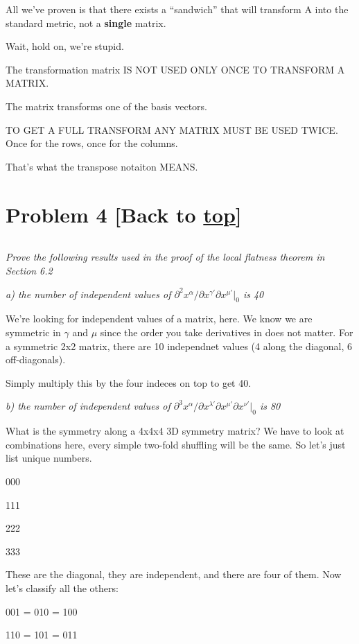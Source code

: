 \documentclass[landscape,letterpaper,10pt,english]{article}
\begin{document}
All we've proven is that there exists a ``sandwich'' that will transform
A into the standard metric, not a \textbf{single} matrix.

    Wait, hold on, we're stupid.

The transformation matrix IS NOT USED ONLY ONCE TO TRANSFORM A MATRIX.

The matrix transforms one of the basis vectors.

TO GET A FULL TRANSFORM ANY MATRIX MUST BE USED TWICE. Once for the
rows, once for the columns.

That's what the transpose notaiton MEANS.

    \hypertarget{problem-4-back-to-top}{%
\section{\texorpdfstring{Problem 4 {[}Back to
\hyperref[toc]{top}{]}}{Problem 4 {[}Back to {]}}}\label{problem-4-back-to-top}}

\[\label{P4}\]

\emph{Prove the following results used in the proof of the local
flatness theorem in Section 6.2}

\emph{a) the number of independent values of
\(\partial^2x^\alpha/\partial x^{\gamma'} \partial x^{\mu'}|_0\) is 40}

    We're looking for independent values of a matrix, here. We know we are
symmetric in \(\gamma\) and \(\mu\) since the order you take derivatives
in does not matter. For a symmetric 2x2 matrix, there are 10 independnet
values (4 along the diagonal, 6 off-diagonals).

Simply multiply this by the four indeces on top to get 40.

    \emph{b) the number of independent values of
\(\partial^3x^\alpha/\partial x^{\lambda'} \partial x^{\mu'} \partial x^{\nu'}|_0\)
is 80}

    What is the symmetry along a 4x4x4 3D symmetry matrix? We have to look
at combinations here, every simple two-fold shuffling will be the same.
So let's just list unique numbers.

000

111

222

333

These are the diagonal, they are independent, and there are four of
them. Now let's classify all the others:

001 = 010 = 100

110 = 101 = 011
\end{document}
